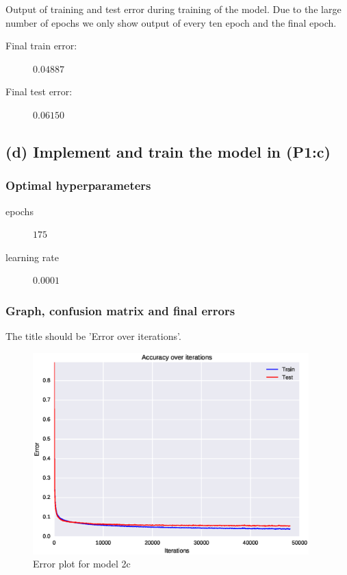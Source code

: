 \documentclass{article}
\begin{document}
Output of training and test error during training of the model. Due to the large
number of epochs we only show output of every ten epoch and the final epoch.



\begin{description}
\item[Final train error:] $0.04887$
\item[Final test error:] $0.06150$
\end{description}

\newpage

\subsection{(d) Implement and train the model in (P1:c)}

\subsubsection{Optimal hyperparameters}

\begin{description}
\item[epochs] $175$
\item[learning rate] $0.0001$
\end{description}

\subsubsection{Graph, confusion matrix and final errors}

The title should be 'Error over iterations'.

\begin{figure}[H]
  \centering
  \includegraphics[width=0.95\textwidth]{error_model_2c.eps}
  \caption{Error plot for model 2c}
  \label{fig:err_2c}
\end{figure}
\end{document}
